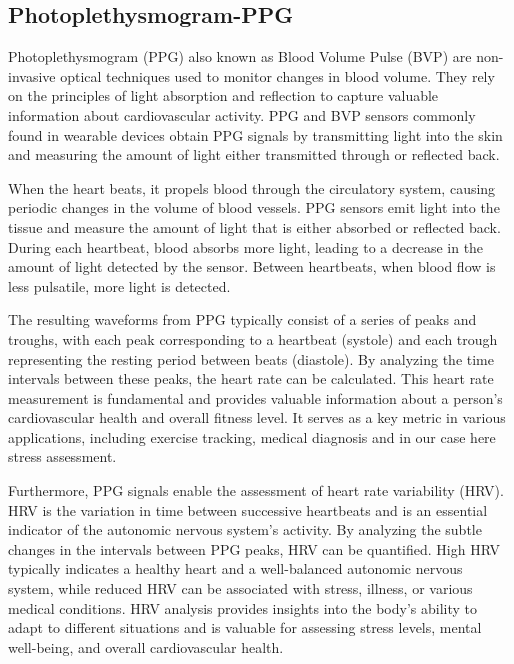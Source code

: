 \subsection{Photoplethysmogram-PPG}
\label{subsec:PPGtheory}

Photoplethysmogram (PPG) also known as  Blood Volume Pulse (BVP) are non-invasive optical techniques used to monitor changes in blood volume. They rely on the principles of light absorption and reflection to capture valuable information about cardiovascular activity. PPG and BVP sensors commonly found in wearable devices obtain PPG signals by transmitting light into the skin and measuring the amount of light either transmitted through or reflected back.\parencite{ppg} 

When the heart beats, it propels blood through the circulatory system, causing periodic changes in the volume of blood vessels. PPG sensors emit light into the tissue and measure the amount of light that is either absorbed or reflected back. During each heartbeat, blood absorbs more light, leading to a decrease in the amount of light detected by the sensor. Between heartbeats, when blood flow is less pulsatile, more light is detected.\parencite{ppg2}

The resulting waveforms from PPG typically consist of a series of peaks and troughs, with each peak corresponding to a heartbeat (systole) and each trough representing the resting period between beats (diastole). By analyzing the time intervals between these peaks, the heart rate can be calculated. This heart rate measurement is fundamental and provides valuable information about a person's cardiovascular health and overall fitness level. It serves as a key metric in various applications, including exercise tracking, medical diagnosis and in our case here stress assessment.

Furthermore, PPG signals enable the assessment of heart rate variability (HRV). HRV is the variation in time between successive heartbeats and is an essential indicator of the autonomic nervous system's activity. By analyzing the subtle changes in the intervals between PPG peaks, HRV can be quantified. High HRV typically indicates a healthy heart and a well-balanced autonomic nervous system, while reduced HRV can be associated with stress, illness, or various medical conditions. HRV analysis provides insights into the body's ability to adapt to different situations and is valuable for assessing stress levels, mental well-being, and overall cardiovascular health.


